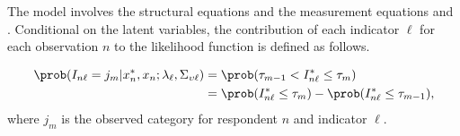 \documentclass[12pt,a4paper]{article}
\begin{document}
The model involves the structural equations  and the measurement equations  and . Conditional on the latent variables, the contribution of each indicator $\ell$ for each observation $n$ to the likelihood function is defined as follows.

\begin{equation}
  \label{eq:discreteMeas-d}
  \begin{aligned}
    \prob(I_{n\ell} = j_m| x^*_n, x_n ; \lambda_\ell, \Sigma_{\upsilon \ell}) &= \prob(\tau_{m-1} < I^*_{n\ell} \leq \tau_m) \\
    &= \prob(I^*_{n\ell} \leq \tau_m) -  \prob(I^*_{n\ell} \leq \tau_{m-1}),
  \end{aligned}
\end{equation}
where $j_m$ is the observed category for respondent $n$ and indicator $\ell$.
\end{document}
